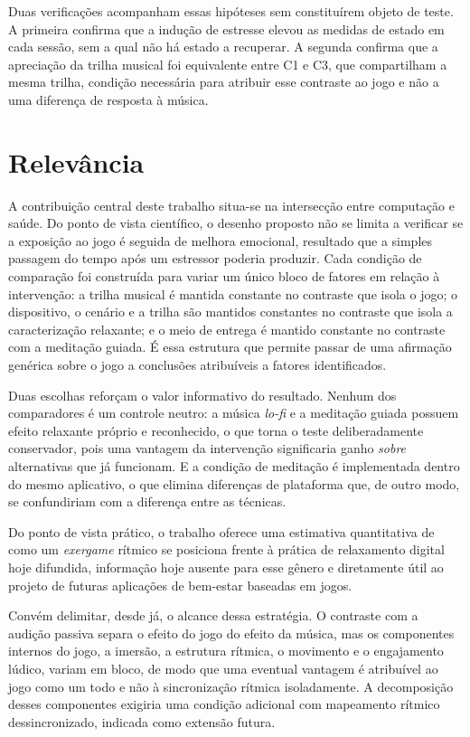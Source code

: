 Duas verificações acompanham essas hipóteses sem constituírem objeto de teste. A primeira confirma que a indução de estresse elevou as medidas de estado em cada sessão, sem a qual não há estado a recuperar. A segunda confirma que a apreciação da trilha musical foi equivalente entre C1 e C3, que compartilham a mesma trilha, condição necessária para atribuir esse contraste ao jogo e não a uma diferença de resposta à música.

\section{Relevância}\label{sec:relevancia}

A contribuição central deste trabalho situa-se na intersecção entre computação e saúde. Do ponto de vista científico, o desenho proposto não se limita a verificar se a exposição ao jogo é seguida de melhora emocional, resultado que a simples passagem do tempo após um estressor poderia produzir. Cada condição de comparação foi construída para variar um único bloco de fatores em relação à intervenção: a trilha musical é mantida constante no contraste que isola o jogo; o dispositivo, o cenário e a trilha são mantidos constantes no contraste que isola a caracterização relaxante; e o meio de entrega é mantido constante no contraste com a meditação guiada. É essa estrutura que permite passar de uma afirmação genérica sobre o jogo a conclusões atribuíveis a fatores identificados.

Duas escolhas reforçam o valor informativo do resultado. Nenhum dos comparadores é um controle neutro: a música \textit{lo-fi} e a meditação guiada possuem efeito relaxante próprio e reconhecido, o que torna o teste deliberadamente conservador, pois uma vantagem da intervenção significaria ganho \emph{sobre} alternativas que já funcionam. E a condição de meditação é implementada dentro do mesmo aplicativo, o que elimina diferenças de plataforma que, de outro modo, se confundiriam com a diferença entre as técnicas.

Do ponto de vista prático, o trabalho oferece uma estimativa quantitativa de como um \textit{exergame} rítmico se posiciona frente à prática de relaxamento digital hoje difundida, informação hoje ausente para esse gênero e diretamente útil ao projeto de futuras aplicações de bem-estar baseadas em jogos.

Convém delimitar, desde já, o alcance dessa estratégia. O contraste com a audição passiva separa o efeito do jogo do efeito da música, mas os componentes internos do jogo, a imersão, a estrutura rítmica, o movimento e o engajamento lúdico, variam em bloco, de modo que uma eventual vantagem é atribuível ao jogo como um todo e não à sincronização rítmica isoladamente. A decomposição desses componentes exigiria uma condição adicional com mapeamento rítmico dessincronizado, indicada como extensão futura.

